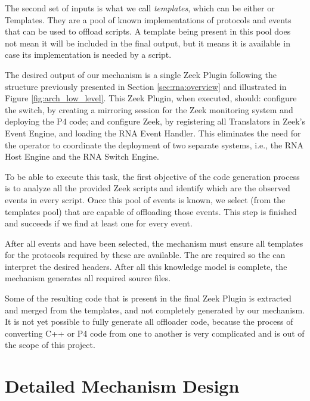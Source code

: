 The second set of inputs is what we call \textit{templates}, which can be either  \ProtocolTemplates{} or \Offloader{} Templates. They are a pool of known implementations of protocols and events that can be used to offload scripts. A template being present in this pool does not mean it will be included in the final output, but it means it is available in case its implementation is needed by a script.

The desired output of our mechanism is a single Zeek Plugin following the structure previously presented in Section \ref{sec:rna:overview} and illustrated in Figure \ref{fig:arch_low_level}. This Zeek Plugin, when executed, should: configure the switch, by creating a mirroring session for the Zeek monitoring system and deploying the P4 code; and configure Zeek, by registering all Translators in Zeek's Event Engine, and loading the RNA Event Handler. This eliminates the need for the operator to coordinate the deployment of two separate systems, i.e., the RNA Host Engine and the RNA Switch Engine.

To be able to execute this task, the first objective of the code generation process is to analyze all the provided Zeek scripts and identify which are the observed events in every script. Once this pool of events is known, we select \Offloaders{} (from the templates pool) that are capable of offloading those events. This step is finished and succeeds if we find at least one \Offloader{} for every event.

After all events and \Offloaders{} have been selected, the mechanism must ensure all templates for the protocols required by these \Offloaders{} are available. The \ProtocolTemplates{} are required so the \Offloaders{} can interpret the desired headers. After all this knowledge model is complete, the mechanism generates all required source files.

Some of the resulting code that is present in the final Zeek Plugin is extracted and merged from the templates, and not completely generated by our mechanism. It is not yet possible to fully generate all offloader code, because the process of converting C++ or P4 code from one to another is very complicated and is out of the scope of this project.



\section{Detailed Mechanism Design}
\label{sec:code_gen:detailed}

